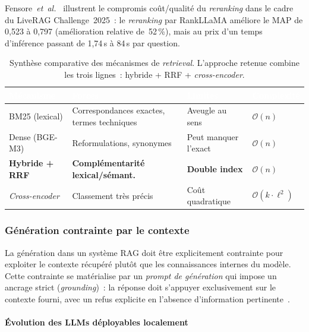 \documentclass[11pt,a4paper]{article}
\begin{document}
Fensore~\textit{et~al.}~\cite{fensore2025liverag} illustrent le compromis coût/qualité du \textit{reranking} dans le cadre du LiveRAG Challenge~2025~: le \textit{reranking} par RankLLaMA améliore le MAP de 0,523 à 0,797 (amélioration relative de~52\,\%), mais au prix d'un temps d'inférence passant de 1,74\,s à 84\,s par question.

\begin{table}[H]
\centering
\small
\begin{tabularx}{\linewidth}{L{3cm} L{3.5cm} L{3.5cm} C{2.5cm}}
\toprule
{}
\textcolor{white}{\textbf{Mécanisme}} &
\textcolor{white}{\textbf{Forces}} &
\textcolor{white}{\textbf{Limites}} &
\textcolor{white}{\textbf{Complexité}} \\
\midrule
BM25 (lexical)        & Correspondances exactes, termes techniques   & Aveugle au sens        & $\mathcal{O}(n)$ \\
Dense (BGE-M3)        & Reformulations, synonymes                     & Peut manquer l'exact   & $\mathcal{O}(n)$ \\
\textbf{Hybride + RRF} & \textbf{Complémentarité lexical/sémant.}      & \textbf{Double index}  & $\mathcal{O}(n)$ \\
\textit{Cross-encoder}& Classement très précis                        & Coût quadratique       & $\mathcal{O}(k \cdot \ell^2)$ \\
\bottomrule
\end{tabularx}
\caption{Synthèse comparative des mécanismes de \textit{retrieval}. L'approche retenue combine les trois lignes~: hybride + RRF + \textit{cross-encoder}.}
\label{tab:retrieval}
\end{table}

\subsubsection{Génération contrainte par le contexte}

La génération dans un système RAG doit être explicitement contrainte pour exploiter le contexte récupéré plutôt que les connaissances internes du modèle. Cette contrainte se matérialise par un \textit{prompt de génération} qui impose un ancrage strict (\textit{grounding})~: la réponse doit s'appuyer exclusivement sur le contexte fourni, avec un refus explicite en l'absence d'information pertinente~\cite{gao2024ragsurvey}.

\paragraph{Évolution des LLMs déployables localement}
\end{document}
